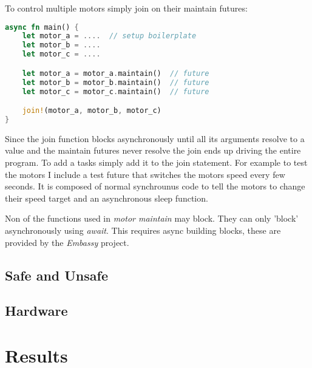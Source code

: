 \documentclass[lang=en, hanging-titles=true]{skrapport}
\begin{document}
To control multiple motors simply join on their maintain futures: 

\begin{minipage}{\linewidth} %
\begin{lstlisting}[language=rust, style=boxed, tabsize=2]
async fn main() {
	let motor_a = ....  // setup boilerplate
	let motor_b = ....
	let motor_c = ....

	let motor_a = motor_a.maintain()  // future
	let motor_b = motor_b.maintain()  // future
	let motor_c = motor_c.maintain()  // future

	join!(motor_a, motor_b, motor_c)
}
\end{lstlisting}
\end{minipage}

Since the join function blocks asynchronously until all its arguments resolve to a value and the maintain futures never resolve the join ends up driving the entire program. To add a tasks simply add it to the join statement. For example to test the motors I include a test future that switches the motors speed every few seconds. It is composed of normal synchrounus code to tell the motors to change their speed target and an asynchronous sleep function.

Non of the functions used in \textit{motor maintain} may block. They can only 'block' asynchronously using \textit{await}. This requires async building blocks, these are provided by the \textit{Embassy}\cite{embassy} project.

\subsection{Safe and Unsafe}

\subsection{Hardware}

\section{Results}
\label{sec:results}

%
%
%
%
%

\clearpage
\appendix
% 
\printbibliography
\end{document}
